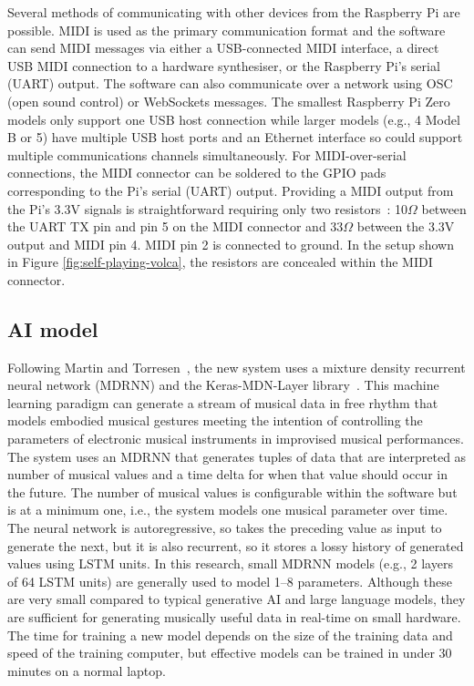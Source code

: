 \documentclass[sigconf]{nimeart}
\begin{document}
Several methods of communicating with other devices from the Raspberry Pi are possible.
MIDI is used as the primary communication format and the software can send MIDI messages via either a USB-connected MIDI interface, a direct USB MIDI connection to a hardware synthesiser, or the Raspberry Pi's serial (UART) output. 
The software can also communicate over a network using OSC (open sound control) or WebSockets messages. 
The smallest Raspberry Pi Zero models only support one USB host connection while larger models (e.g., 4 Model B or 5) have multiple USB host ports and an Ethernet interface so could support multiple communications channels simultaneously.
For MIDI-over-serial connections, the MIDI connector can be soldered to the GPIO pads corresponding to the Pi's serial (UART) output. 
Providing a MIDI output from the Pi's 3.3V signals is straightforward requiring only two resistors~\cite{MIDI-Manufacturers-Association:2014aa}: 10$\Omega$ between the UART TX pin and pin 5 on the MIDI connector and 33$\Omega$ between the 3.3V output and MIDI pin 4. 
MIDI pin 2 is connected to ground. 
In the setup shown in Figure \ref{fig:self-playing-volca}, the resistors are concealed within the MIDI connector.

\subsection{AI model}

Following Martin and Torresen~\cite{Martin2019}, the new system uses a mixture density recurrent neural network (MDRNN) and the Keras-MDN-Layer library~\cite{keras-mdn-layer}.
This machine learning paradigm can generate a stream of musical data in free rhythm that models embodied musical gestures meeting the intention of controlling the parameters of electronic musical instruments in improvised musical performances.
The system uses an MDRNN that generates tuples of data that are interpreted as number of musical values and a time delta for when that value should occur in the future. 
The number of musical values is configurable within the software but is at a minimum one, i.e., the system models one musical parameter over time. 
The neural network is autoregressive, so takes the preceding value as input to generate the next, but it is also recurrent, so it stores a lossy history of generated values using LSTM units. 
In this research, small MDRNN models (e.g., 2 layers of 64 LSTM units) are generally used to model 1--8 parameters.
Although these are very small compared to typical generative AI and large language models, they are sufficient for generating musically useful data in real-time on small hardware.
The time for training a new model depends on the size of the training data and speed of the training computer, but effective models can be trained in under 30 minutes on a normal laptop.
\end{document}
